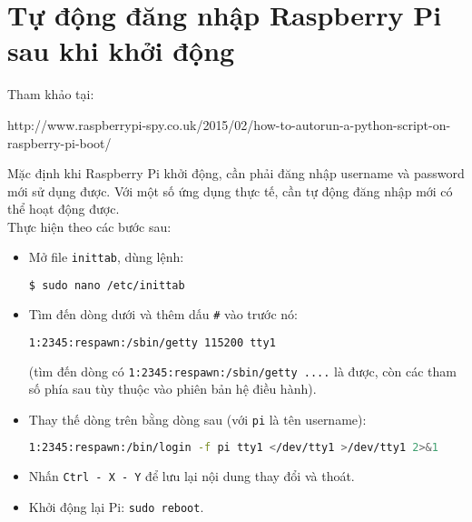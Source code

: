 \chapter{Tự động đăng nhập Raspberry Pi sau khi khởi động}
\label{Sub:auto-login}
Tham khảo tại:

\textsf{http://www.raspberrypi-spy.co.uk/2015/02/how-to-autorun-a-python-script-on-raspberry-pi-boot/}

Mặc định khi Raspberry Pi khởi động, cần phải đăng nhập username và password mới sử dụng được. Với một số ứng dụng thực tế, cần tự động đăng nhập mới có thể hoạt động được.\\

Thực hiện theo các bước sau:
\begin{itemize}
\item Mở file \verb|inittab|, dùng lệnh:
\begin{lstlisting}[language=bash]
$ sudo nano /etc/inittab
\end{lstlisting}
\item Tìm đến dòng dưới và thêm dấu \verb|#| vào trước nó:
\begin{lstlisting}[language=bash]
1:2345:respawn:/sbin/getty 115200 tty1
\end{lstlisting}
(tìm đến dòng có \verb|1:2345:respawn:/sbin/getty ....| là được, còn các tham số phía sau tùy thuộc vào phiên bản hệ điều hành).
\item Thay thế dòng trên bằng dòng sau (với \verb|pi| là tên username):
\begin{lstlisting}[language=bash]
1:2345:respawn:/bin/login -f pi tty1 </dev/tty1 >/dev/tty1 2>&1
\end{lstlisting}
\item Nhấn \verb|Ctrl - X - Y| để lưu lại nội dung thay đổi và thoát.
\item Khởi động lại Pi: \verb|sudo reboot|.
\end{itemize}